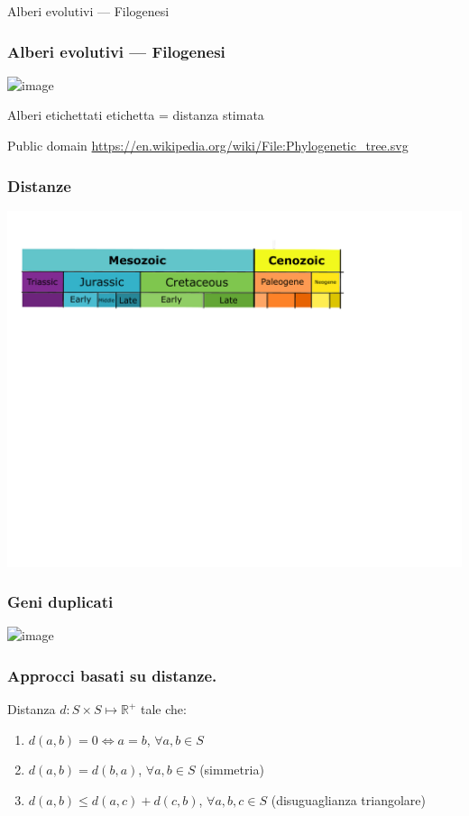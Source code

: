


\begin{frame}
  \titlepage

  \centering
  Alberi evolutivi --- Filogenesi
\end{frame}



\begin{frame}
\frametitle{Alberi evolutivi --- Filogenesi}

\centering
\includegraphics<1>[height=0.55\textheight]{figures/Phylogenetic_tree_legend}

\begin{block}{Alberi etichettati}
etichetta = distanza stimata
\end{block}

\vfill\small
Public domain \url{https://en.wikipedia.org/wiki/File:Phylogenetic_tree.svg}
\end{frame}

\begin{frame}
\frametitle{Distanze}
\centering
\includegraphics[height=0.95\textheight]{figures/Phylogenetic_chart_of_Lepidoptera_chronogram}
\end{frame}

\begin{frame}
\frametitle{Geni duplicati}
\centering
\includegraphics<1>[width=0.7\textwidth]{figures/Evolution_fate_duplicate_genes}
\end{frame}

\begin{frame}[fragile]
\frametitle{Approcci basati su distanze.}
\begin{block}{Distanza}
$d: S \times S \mapsto \mathbb{R}^{+}$ tale che:
\begin{enumerate}
\item
$d(a,b) = 0 \Leftrightarrow a=b$, $\forall a,b\in S$
\item
$d(a,b) = d(b,a)$, $\forall a,b\in S$ (simmetria)
\item
$d(a,b) \le d(a,c) + d(c,b)$, $\forall a,b,c\in S$ (disuguaglianza triangolare)
\end{enumerate}
\end{block}
\end{frame}



